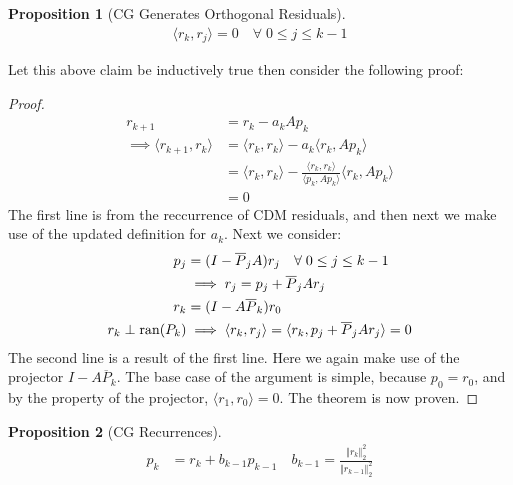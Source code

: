 \documentclass[]{article}
\theoremstyle{definition}
\newtheorem{prop}{Proposition}[section]  %
\begin{document}
            \begin{prop}[CG Generates Orthogonal Residuals]\label{prop:CG_Generates_Orthogonal_Residuals}
                \begin{align}
                    \langle r_k , r_j \rangle = 0 \quad \forall\; 0 \le j \le k - 1 
                \end{align}
            \end{prop}
            \noindent
            Let this above claim be inductively true then consider the following proof: 
            \begin{proof}
                \begin{align}
                    r_{k + 1} &= r_k - a_kAp_k
                    \\
                    \implies 
                    \langle r_{k + 1}, r_k\rangle &= \langle r_k, r_k\rangle - 
                    a_k \langle r_k, Ap_k\rangle
                    \\
                    &= \langle r_k, r_k\rangle - 
                    \frac{\langle r_k, r_k\rangle}{\langle p_k, Ap_k\rangle}
                    \langle r_k, Ap_k\rangle
                    \\
                    &= 
                    0
                \end{align}
                The first line is from the reccurrence of CDM residuals, and then next we make use of the updated definition for $a_k$. Next we consider: 
                \begin{align}
                    p_j &= (I - \overline{P}_jA)r_j \quad \forall\; 0\le j \le k - 1
                    \\
                    \hspace{1.1em} & \implies r_j = p_j + \overline{P}_jAr_j
                    \\
                    r_k &= (I - A\overline{P}_k)r_0
                    \\
                    r_k\perp \text{ran}(P_k) & \implies 
                    \langle r_k, r_j\rangle =\langle r_k, p_j + \overline{P}_jAr_j\rangle = 0
                \end{align}
                The second line is a result of the first line. Here we again make use of the projector $I - A \overline{P}_k$. The base case of the argument is simple, because $p_0 = r_0$, and by the property of the projector, $\langle r_1, r_0\rangle = 0$. The theorem is now proven. 
            \end{proof}
            \begin{prop}[CG Recurrences]
                \begin{align}
                    p_k &= r_k + b_{k - 1}p_{k - 1} \quad b_{k - 1} = \frac{\Vert r_k\Vert_2^2}
                    {\Vert r_{k - 1}\Vert_2^2}
                \end{align}
            \end{prop}
\end{document}
